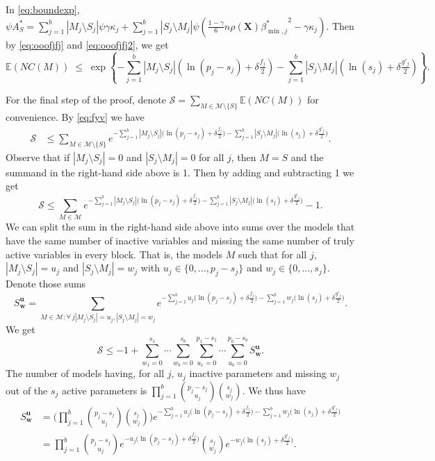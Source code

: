\documentclass[
  12pt]{article}
\newcommand{\E}{\mathbb{E}}
\newcommand{\M}{\mathcal{M}}
\newcommand{\bu}{\mathbf{u}}
\newcommand{\bw}{\mathbf{w}}
\newcommand{\bX}{\mathbf{X}}
\begin{document}
In \eqref{eq:boundexp}, $\psi A^*_S=\sum_{j=1}^b|M_j \setminus S_j|\psi\gamma\kappa_j + \sum_{j=1}^b |S_j\setminus M_j |\psi\left(\tfrac{1-\gamma}{6} n \rho(\bX) {\beta^*_{\min,j}}^{2} - \gamma\kappa_j\right)$. Then by \eqref{eq:ooofjfj} and \eqref{eq:ooofjfj2}, we get
\begin{equation}\label{eq:fyv}
\E(NC(M))\;\leq\;\exp\left\{- \sum_{j=1}^b |M_j\setminus S_j|(\ln(p_j-s_j)+\delta \tfrac{f_j}{2})-\sum_{j=1}^b |S_j\setminus M_j|(\ln(s_j)+\delta \tfrac{g'_j}{2})\right\}.    
\end{equation}

For the final step of the proof, denote $\mathcal{S}= \sum_{M \in \M\setminus \{S\}} \E\left(NC(M)\right)$ for convenience. By \eqref{eq:fyv} we have
\begin{align*}
    \mathcal{S} &\leq \sum_{M \in \M\setminus \{S\}}e^{- \sum_{j=1}^b |M_j\setminus S_j|\big(\ln(p_j-s_j)+\delta \tfrac{f_j}{2}\big)-\sum_{j=1}^b |S_j\setminus M_j|\big(\ln(s_j)+\delta \tfrac{g'_j}{2}\big)}.
\end{align*}
Observe that if $|M_j\setminus S_j|=0$ and $|S_j\setminus M_j|=0$ for all $j$, then $M=S$ and the summand in the right-hand side above is 1. Then by adding and subtracting 1 we get
$$\mathcal{S} \leq \sum_{M \in \M}e^{- \sum_{j=1}^b |M_j\setminus S_j|\big(\ln(p_j-s_j)+\delta \tfrac{f_j}{2}\big)-\sum_{j=1}^b |S_j\setminus M_j|\big(\ln(s_j)+\delta \tfrac{g'_j}{2}\big)}-1.$$
We can split the sum in the right-hand side above into sums over the models that have the same number of inactive variables and missing the same number of truly active variables in every block. That is, the models $M$ such that for all $j$, $|M_j\setminus S_j|=u_j$ and $|S_j\setminus M_j|=w_j$ with $u_j \in \{0,\ldots,p_j-s_j\}$ and $w_j \in \{0,\ldots,s_j\}$. Denote those sums
$$S^{\bu}_{\bw}=\sum_{M \in \M:\forall \,j |M_j\setminus S_j|=u_j, |S_j\setminus M_j|=w_j } e^{- \sum_{j=1}^b u_j\big(\ln(p_j-s_j)+\delta \tfrac{f_j}{2}\big)-\sum_{j=1}^b w_j\big(\ln(s_j)+\delta \tfrac{g'_j}{2}\big)}.$$
We get
\begin{equation}\label{eq:uygfew}
    \mathcal{S} \leq -1+\sum_{w_1=0}^{s_1}\cdots\sum_{w_b=0}^{s_b}\sum_{u_1=0}^{p_1-s_1}\cdots\sum_{u_b=0}^{p_b-s_b}S^{\bu}_{\bw}.
\end{equation}
The number of models having, for all $j$, $u_j$ inactive parameters and missing $w_j$ out of the $s_j$ active parameters %
is $\prod_{j=1}^b {\binom{p_j-s_j}{u_j}}{\binom{s_j}{w_j}}$. We thus have
\begin{align*}
    S^{\bu}_{\bw}&= \bigg(\prod_{j=1}^b {\binom{p_j-s_j}{u_j}}{\binom{s_j}{w_j}}\bigg)e^{- \sum_{j=1}^b u_j\big(\ln(p_j-s_j)+\delta \tfrac{f_j}{2}\big)-\sum_{j=1}^b w_j\big(\ln(s_j)+\delta \tfrac{g'_j}{2}\big)} \\
    &= \prod_{j=1}^b {\binom{p_j-s_j}{u_j}}e^{- u_j\big(\ln(p_j-s_j)+\delta \tfrac{f_j}{2}\big)}{\binom{s_j}{w_j}}e^{-w_j\big(\ln(s_j)+\delta \tfrac{g'_j}{2}\big)}.
\end{align*}
\end{document}
